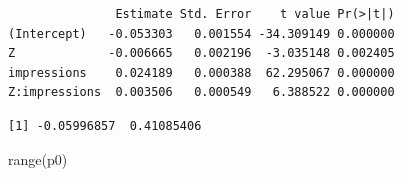 \documentclass[
  letterpaper,
  DIV=11,
  numbers=noendperiod]{scrartcl}
\newenvironment{Shaded}{\begin{snugshade}}{\end{snugshade}}
\newcommand{\AttributeTok}[1]{\textcolor[rgb]{0.40,0.45,0.13}{#1}}
\newcommand{\DecValTok}[1]{\textcolor[rgb]{0.68,0.00,0.00}{#1}}
\newcommand{\FunctionTok}[1]{\textcolor[rgb]{0.28,0.35,0.67}{#1}}
\newcommand{\NormalTok}[1]{\textcolor[rgb]{0.00,0.23,0.31}{#1}}
\newcommand{\OtherTok}[1]{\textcolor[rgb]{0.00,0.23,0.31}{#1}}
\newcommand{\SpecialCharTok}[1]{\textcolor[rgb]{0.37,0.37,0.37}{#1}}
\newcommand{\StringTok}[1]{\textcolor[rgb]{0.13,0.47,0.30}{#1}}
\begin{document}
\begin{Shaded}
\end{Shaded}

\begin{verbatim}
               Estimate Std. Error    t value Pr(>|t|)
(Intercept)   -0.053303   0.001554 -34.309149 0.000000
Z             -0.006665   0.002196  -3.035148 0.002405
impressions    0.024189   0.000388  62.295067 0.000000
Z:impressions  0.003506   0.000549   6.388522 0.000000
\end{verbatim}

\begin{Shaded}
\end{Shaded}

\begin{verbatim}
[1] -0.05996857  0.41085406
\end{verbatim}

\begin{Shaded}
\begin{Highlighting}[]
\FunctionTok{range}\NormalTok{(p0)}
\end{Highlighting}
\end{Shaded}
\end{document}
